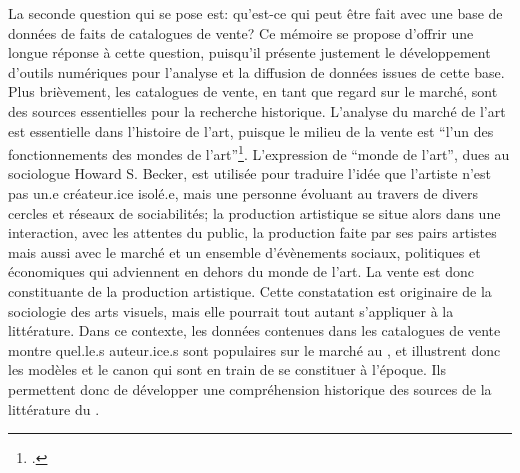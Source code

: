La seconde question qui se pose est: qu'est-ce qui peut être fait avec une base de données de faits de catalogues de vente? Ce mémoire se propose d'offrir une longue réponse à cette question, puisqu'il présente justement le développement d'outils numériques pour l'analyse et la diffusion de données issues de cette base. Plus brièvement, les catalogues de vente, en tant que regard sur le marché, sont des sources essentielles pour la recherche historique. L'analyse du marché de l'art est essentielle dans l'histoire de l'art, puisque le milieu de la vente est \enquote{l'un des fonctionnements des mondes de l'art}\footcite[p. 64]{de_maupeou_les_2013}. L'expression de \enquote{monde de l'art}, dues au sociologue Howard S. Becker, est utilisée pour traduire l'idée que l'artiste n'est pas un.e créateur.ice isolé.e, mais une personne évoluant au travers de divers cercles et réseaux de sociabilités; la production artistique se situe alors dans une interaction, avec les attentes du public, la production faite par ses pairs artistes mais aussi avec le marché et un ensemble d'évènements sociaux, politiques et économiques qui adviennent en dehors du monde de l'art. La vente est donc constituante de la production artistique. Cette constatation est originaire de la sociologie des arts visuels, mais elle pourrait tout autant s'appliquer à la littérature. Dans ce contexte, les données contenues dans les catalogues de vente montre quel.le.s auteur.ice.s sont populaires sur le marché au , et illustrent donc les modèles et le canon qui sont en train de se constituer à l'époque. Ils permettent donc de développer une compréhension historique des sources de la littérature du . 

